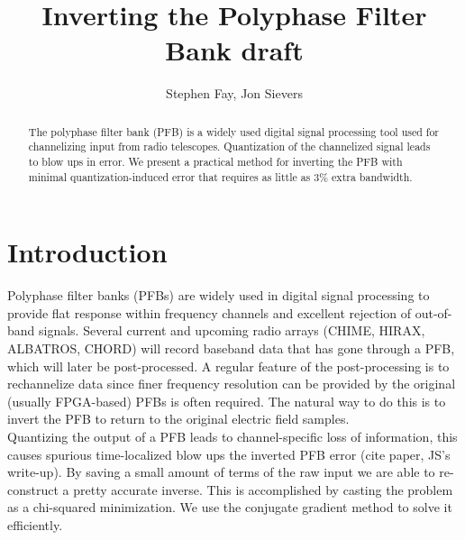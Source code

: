 \documentclass[12pt]{article}
\begin{document}
\title{Inverting the Polyphase Filter Bank draft}
\author{Stephen Fay, Jon Sievers}
\maketitle

\tableofcontents

\begin{abstract}
    The polyphase filter bank (PFB) is a widely used digital signal processing tool used for channelizing input from radio telescopes. Quantization of the channelized signal leads to blow ups in error. We present a practical method for inverting the PFB with minimal quantization-induced error that requires as little as 3\% extra bandwidth.
\end{abstract}



\section{Introduction}


Polyphase filter banks (PFBs) are widely used in digital signal processing to provide flat response within frequency channels and excellent rejection of out-of-band signals. Several current and upcoming radio arrays (CHIME, HIRAX, ALBATROS, CHORD) will record baseband data that has gone through a PFB, which will later be post-processed. A regular feature of the post-processing is to rechannelize data since finer frequency resolution can be provided by the original (usually FPGA-based) PFBs is often required. The natural way to do this is to invert the PFB to return to the original electric field samples. \\ %


Quantizing the output of a PFB leads to channel-specific loss of information, this causes spurious time-localized blow ups the inverted PFB error (cite paper, JS's write-up). By saving a small amount of terms of the raw input we are able to re-construct a pretty accurate inverse. This is accomplished by casting the problem as a chi-squared minimization. We use the conjugate gradient method to solve it efficiently. \\ 
\end{document}
